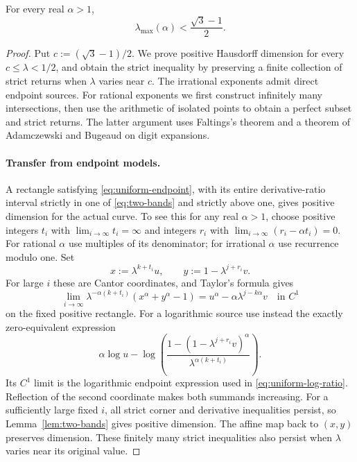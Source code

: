 \begin{theorem}\label{thm:last-real}
For every real \(\alpha>1\),
\[
\lambda_{\max}(\alpha)<\frac{\sqrt3-1}{2}.
\]
\end{theorem}
\begin{proof}
Put $c:=(\sqrt3-1)/2$. We prove positive Hausdorff dimension for
every $c\le\lambda<1/2$, and obtain the strict inequality by preserving
a finite collection of strict returns when $\lambda$ varies near $c$.
The irrational exponents admit direct endpoint sources. For rational
exponents we first construct infinitely many intersections, then use
the arithmetic of isolated points to obtain a perfect subset and strict
returns. The latter argument uses Faltings's theorem and a theorem of
Adamczewski and Bugeaud on digit expansions.

\paragraph{Transfer from endpoint models.}
A rectangle satisfying \eqref{eq:uniform-endpoint}, with its entire
derivative-ratio interval strictly in one of \eqref{eq:two-bands} and
strictly above one, gives positive dimension for the actual curve.
To see this for any real $\alpha>1$, choose positive integers $t_i$ with
$\displaystyle\lim_{i\to\infty}t_i=\infty$ and integers $r_i$ with
$\displaystyle\lim_{i\to\infty}(r_i-\alpha t_i)=0$.
For rational $\alpha$ use multiples of its denominator; for irrational
$\alpha$ use recurrence modulo one. Set
\[
x:=\lambda^{k+t_i}u,\qquad y:=1-\lambda^{j+r_i}v.
\]
For large $i$ these are Cantor coordinates, and Taylor's formula gives
\[
\lim_{i\to\infty}
\lambda^{-\alpha(k+t_i)}(x^\alpha+y^\alpha-1)
=u^\alpha-\alpha\lambda^{j-k\alpha}v
\quad\text{in }C^1
\]
on the fixed positive rectangle. For a logarithmic source use instead
the exactly zero-equivalent expression
\[
\alpha\log u-
\log\left(\frac{1-(1-\lambda^{j+r_i}v)^\alpha}
{\lambda^{\alpha(k+t_i)}}\right).
\]
Its $C^1$ limit is the logarithmic endpoint expression used in
\eqref{eq:uniform-log-ratio}. Reflection of the second coordinate makes
both summands increasing. For a sufficiently large fixed $i$, all
strict corner and derivative inequalities persist, so
Lemma~\ref{lem:two-bands} gives positive dimension. The affine map back
to $(x,y)$ preserves dimension. These finitely many strict inequalities
also persist when $\lambda$ varies near its original value.








\end{proof}
